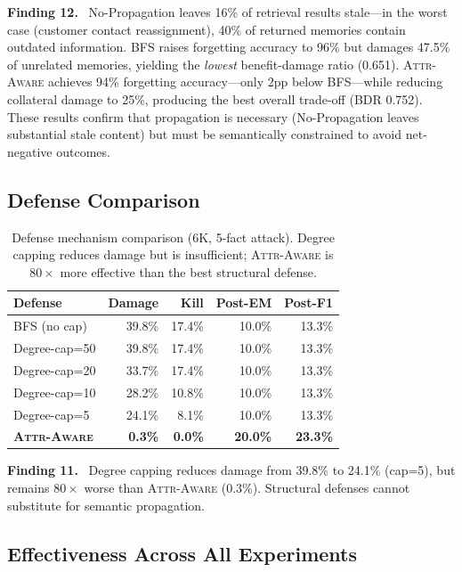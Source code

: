 \documentclass[11pt]{article}
\newcommand{\attraware}{\textsc{Attr-Aware}}
\newcommand{\bfsprop}{\textsc{BFS}}
\newcommand{\finding}[1]{\vspace{2pt}\noindent\textbf{Finding #1.}~}
\begin{document}
\finding{12} No-Propagation leaves 16\% of retrieval results stale---in the worst case (customer contact reassignment), 40\% of returned memories contain outdated information.
\bfsprop{} raises forgetting accuracy to 96\% but damages 47.5\% of unrelated memories, yielding the \textit{lowest} benefit-damage ratio (0.651).
\attraware{} achieves 94\% forgetting accuracy---only 2pp below \bfsprop{}---while reducing collateral damage to 25\%, producing the best overall trade-off (BDR 0.752).
These results confirm that propagation is necessary (No-Propagation leaves substantial stale content) but must be semantically constrained to avoid net-negative outcomes.

\subsection{Defense Comparison}

\begin{table}[htbp]
\centering
\small
\begin{tabular}{lrrrr}
\toprule
\textbf{Defense} & \textbf{Damage} & \textbf{Kill} & \textbf{Post-EM} & \textbf{Post-F1} \\
\midrule
\bfsprop{} (no cap) & 39.8\% & 17.4\% & 10.0\% & 13.3\% \\
Degree-cap=50 & 39.8\% & 17.4\% & 10.0\% & 13.3\% \\
Degree-cap=20 & 33.7\% & 17.4\% & 10.0\% & 13.3\% \\
Degree-cap=10 & 28.2\% & 10.8\% & 10.0\% & 13.3\% \\
Degree-cap=5 & 24.1\% & 8.1\% & 10.0\% & 13.3\% \\
\textbf{\attraware{}} & \textbf{0.3\%} & \textbf{0.0\%} & \textbf{20.0\%} & \textbf{23.3\%} \\
\bottomrule
\end{tabular}
\caption{Defense mechanism comparison (6K, 5-fact attack). Degree capping reduces damage but is insufficient; \attraware{} is $80\times$ more effective than the best structural defense.}
\label{tab:defense}
\end{table}

\finding{11} Degree capping reduces damage from 39.8\% to 24.1\% (cap=5), but remains $80\times$ worse than \attraware{} (0.3\%). Structural defenses cannot substitute for semantic propagation.

\subsection{Effectiveness Across All Experiments}
\end{document}
